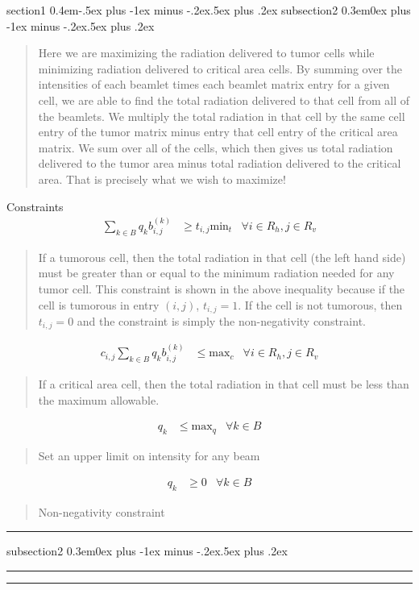 \documentclass[12pt]{article}
\makeatletter
\newenvironment{task}{\@startsection
       {section}{1}
       {0.4em}{-.5ex plus -1ex minus -.2ex}{.5ex plus .2ex}
       {\pagebreak[3]\large\bf\noindent{Task}}}
       {\nopagebreak[3]\vspace{3ex}\begin{center}\rule{1\linewidth}{.3pt}\end{center}}
\newenvironment{subtask}{\@startsection
       {subsection}{2}
       {0.3em}{0ex plus -1ex minus -.2ex}{.5ex plus .2ex}
       {\pagebreak[3]\large}}
       {\nopagebreak[3]\vspace{3ex}\begin{center}\rule{0.5\linewidth}{.3pt}\end{center}}
\makeatother
\begin{document}
\begin{task}{}
\begin{subtask}{}
\begin{quote}
Here we are maximizing the radiation delivered to tumor cells while minimizing radiation delivered to critical area cells. By summing over the intensities of each beamlet times each beamlet matrix entry for a given cell, we are able to find the total radiation delivered to that cell from all of the beamlets.  We multiply the total radiation in that cell by the same cell entry of the tumor matrix minus entry that cell entry of the critical area matrix.  We sum over all of the cells, which then gives us total radiation delivered to the tumor area minus total radiation delivered to the critical area.  That is precisely what we wish to maximize!

\end{quote}

Constraints 
\begin{align}
	\sum_{k \in B} q_k b^{(k)}_{i,j}& \geq t_{i,j}\text{min}_t & \forall i \in R_h, j \in R_v
\end{align}
\begin{quote}
If a tumorous cell, then the total radiation in that cell (the left hand side) must be greater than or equal to the minimum radiation needed for any tumor cell.  This constraint is shown in the above inequality because if the cell is tumorous in entry $(i, j)$, $t_{i,j} = 1$.  If the cell is not tumorous, then $t_{i,j} = 0$ and the constraint is simply the non-negativity constraint.
\end{quote}
\begin{align}
	c_{i,j} \sum_{k \in B} q_k b^{(k)}_{i,j}& \leq \text{max}_c & \forall i \in R_h, j \in R_v
\end{align}
\begin{quote}
If a critical area cell, then the total radiation in that cell must be less than the maximum allowable. 
\end{quote}
\begin{align}
	q_{k} & \leq \text{max}_q & \forall k \in B
\end{align}
\begin{quote}Set an upper limit on intensity for any beam\end{quote}
\begin{align}
	q_{k} & \geq 0 & \forall k \in B
\end{align}
\begin{quote}Non-negativity constraint\end{quote}
\end{subtask}

\begin{subtask}{}


\end{subtask}
\end{task}
\end{document}

